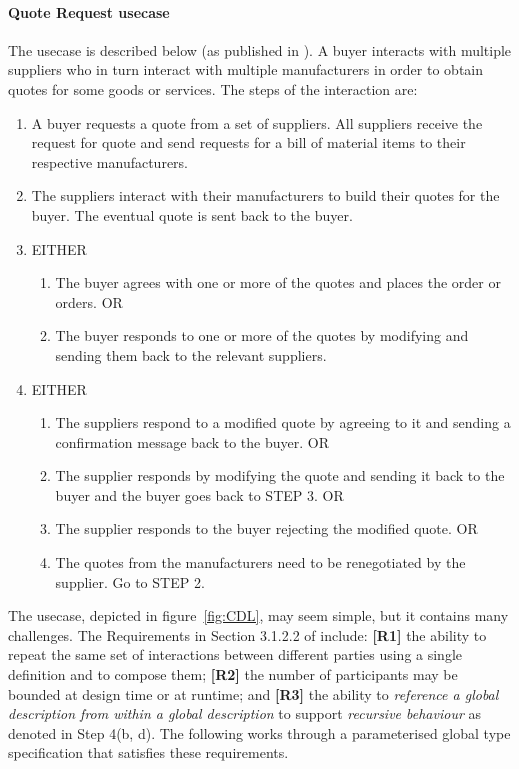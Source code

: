\documentclass{LMCS}
\begin{document}
\paragraph{\bf Quote Request usecase}
The usecase is described below (as published in \cite{CDLRequirements}). 
A buyer interacts with multiple suppliers who in turn
interact with multiple manufacturers in order to obtain quotes for some
goods or services. 
The steps of the interaction are: 
\begin{enumerate}[(1)]
\item A buyer requests a quote from a set of suppliers.
All suppliers receive the request for quote and send requests
for a bill of material items to their respective manufacturers.

\item 
The suppliers interact with their manufacturers to build their quotes
for the buyer. The eventual quote is sent back to the buyer. 

\item EITHER
\begin{enumerate}
\item The buyer agrees with one or more of the quotes and places the order or orders. OR 
\item The buyer responds to one or more of the quotes by modifying 
and sending them back to the relevant suppliers.
\end{enumerate}
\item EITHER
\begin{enumerate}
\item The suppliers respond to a modified quote 
by agreeing to it and sending a confirmation message back to the buyer. OR

\item The supplier responds by modifying the quote and sending it back
to the buyer and the buyer goes back to STEP 3. OR 

\item 
The supplier responds to the buyer rejecting the modified quote. OR 

\item 
The quotes from the manufacturers need to be renegotiated by the supplier. Go to STEP 2. 
\end{enumerate}
\end{enumerate}
The usecase, depicted in figure~\ref{fig:CDL}, may seem simple, 
but it contains many challenges. 
The Requirements 
in Section 3.1.2.2 of \cite{CDLRequirements} include:  
{\bf [R1]} the ability to repeat the same set of interactions 
between different parties using a single definition
and to compose them;
{\bf [R2]} 
the number of participants 
may be bounded at design time or at runtime; and  
{\bf [R3]} 
the ability to {\em reference a global description from within a
global description} to support {\em recursive behaviour} as 
denoted in {\sc Step} 4(b, d).   
The following works through a parameterised 
global type specification that satisfies these requirements.   
\end{document}
